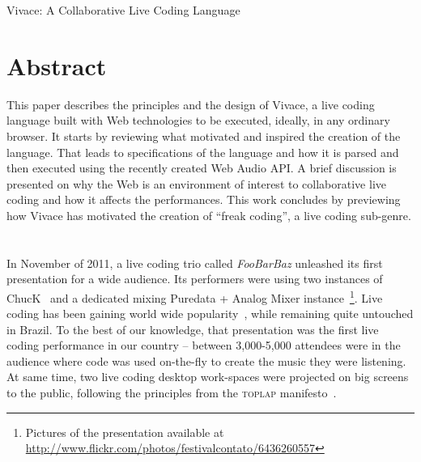 \documentclass[letterpaper, 12pt]{article}
\begin{document}

\vspace*{24pt}


 {\cmjTitle Vivace: A Collaborative Live Coding Language}


\section*{Abstract}

This paper describes the principles and the design of Vivace, a live
coding language built with Web technologies to be executed, ideally, in
any ordinary browser. It starts by reviewing what motivated and
inspired the creation of the language. That leads to specifications of
the language and how it is parsed and then executed using the recently
created Web Audio API. A brief discussion is presented on why the Web
is an environment of interest to collaborative live coding and how it
affects the performances. This work concludes by previewing how
Vivace has motivated the creation of ``freak coding'', a live coding
sub-genre.

\section*{} %

In November of 2011, a live coding trio called \textit{FooBarBaz}
unleashed its first presentation for a wide audience. Its performers
were using two instances of ChucK~\citep*{wang2003chuck} and a
dedicated mixing Puredata + Analog Mixer instance~\footnote{Pictures
  of the presentation available at
  \url{http://www.flickr.com/photos/festivalcontato/6436260557}}. Live
coding has been gaining world wide popularity~\citep*{nilson2007live}, while
remaining quite untouched in Brazil. To the best of our knowledge, that
presentation was the first live coding performance in our
country -- between 3,000-5,000 attendees were in the
audience where code was used on-the-fly to create the music they were
listening. At same time, two live coding desktop work-spaces were projected
on big screens to the public, following the principles from the
\textsc{toplap} manifesto~\citep*{ward2004live}.
\end{document}
